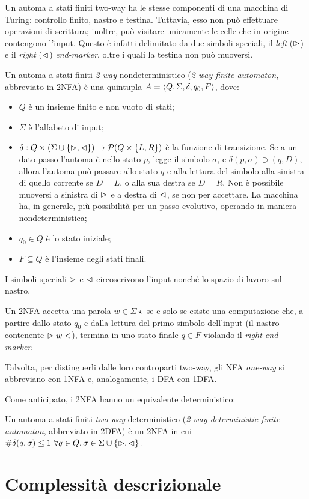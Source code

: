Un automa a stati finiti two-way ha le stesse componenti di una macchina di Turing: controllo finito, nastro e testina. Tuttavia, esso non può effettuare operazioni di scrittura; inoltre, può visitare unicamente le celle che in origine contengono l'input. Questo è infatti delimitato da due simboli speciali, il \emph{left} ($\vartriangleright$) e il \emph{right} ($\vartriangleleft$) \emph{end-marker}, oltre i quali la testina non può muoversi.
\begin{defin}
	Un automa a stati finiti \emph{2-way} nondeterministico (\emph{2-way finite automaton}, abbreviato in 2NFA) è una quintupla $A=\langle Q,\Sigma,\delta,q_0,F \rangle$, dove:
	\begin{itemize}
		\item $Q$ è un insieme finito e non vuoto di stati;
		\item $\Sigma$ è l'alfabeto di input;
		\item $\delta:Q\times(\Sigma\cup\left\{ \vartriangleright,\vartriangleleft \right\})\to\mathcal P(Q\times\left\{ L,R \right\})$ è la funzione di transizione. Se a un dato passo l'automa è nello stato $p$, legge il simbolo $\sigma$, e $\delta(p,\sigma)\ni (q,D)$, allora l'automa può passare allo stato $q$ e alla lettura del simbolo alla sinistra di quello corrente se $D=L$, o alla sua destra se $D=R$. Non è possibile muoversi a sinistra di $\vartriangleright$ e a destra di $\vartriangleleft$, se non per accettare. La macchina ha, in generale, più possibilità per un passo evolutivo, operando in maniera nondeterministica;
		\item $q_0\in Q$ è lo stato iniziale;
		\item $F\subseteq Q$ è l'insieme degli stati finali.
	\end{itemize}
	I simboli speciali $\vartriangleright$ e $\vartriangleleft$ circoscrivono l'input nonché lo spazio di lavoro sul nastro.

	Un 2NFA accetta una parola $w\in\Sigma\star$ se e solo se esiste una computazione che, a partire dallo stato $q_0$ e dalla lettura del primo simbolo dell'input (il nastro contenente $\vartriangleright w\vartriangleleft$), termina in uno stato finale $q\in F$ violando il \emph{right end marker}.
\end{defin}
Talvolta, per distinguerli dalle loro controparti two-way, gli NFA \emph{one-way} si abbreviano con 1NFA e, analogamente, i DFA con 1DFA.

Come anticipato, i 2NFA hanno un equivalente deterministico:
\begin{defin}
	Un automa a stati finiti \emph{two-way} deterministico (\emph{2-way deterministic finite automaton}, abbreviato in 2DFA) è un 2NFA in cui $\# \delta(q,\sigma)\leq 1 ~ \forall q\in Q,\sigma\in\Sigma\cup\left\{ \vartriangleright,\vartriangleleft \right\}$.
\end{defin}



\section{Complessità descrizionale}
